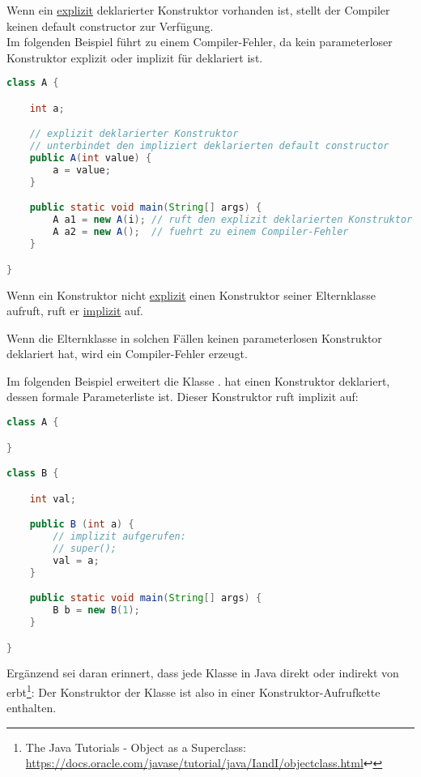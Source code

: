 Wenn ein \underline{explizit} deklarierter Konstruktor vorhanden ist, stellt der Compiler keinen default constructor zur Verfügung.\\

Im folgenden Beispiel führt  zu einem Compiler-Fehler, da kein parameterloser Konstruktor explizit oder implizit für  deklariert ist.

\begin{lstlisting}[language=java]
class A {

    int a;

    // explizit deklarierter Konstruktor
    // unterbindet den impliziert deklarierten default constructor
    public A(int value) {
        a = value;
    }

    public static void main(String[] args) {
        A a1 = new A(i); // ruft den explizit deklarierten Konstruktor auf
        A a2 = new A();  // fuehrt zu einem Compiler-Fehler
    }

}
\end{lstlisting}

Wenn ein Konstruktor nicht \underline{explizit} einen Konstruktor seiner Elternklasse aufruft, ruft er \underline{implizit}  auf.

Wenn die Elternklasse in solchen Fällen keinen parameterlosen Konstruktor deklariert hat, wird ein Compiler-Fehler erzeugt.

Im folgenden Beispiel erweitert  die Klasse .  hat einen Konstruktor deklariert, dessen
formale Parameterliste  ist. Dieser Konstruktor ruft implizit  auf:

\begin{lstlisting}[language=java]
class A {

}

class B {

    int val;

    public B (int a) {
        // implizit aufgerufen:
        // super();
        val = a;
    }

    public static void main(String[] args) {
        B b = new B(1);
    }

}
\end{lstlisting}

Ergänzend sei daran erinnert, dass jede Klasse in Java direkt oder indirekt von  erbt\footnote{
    The Java Tutorials - Object as a Superclass: \url{https://docs.oracle.com/javase/tutorial/java/IandI/objectclass.html}↩
}: Der Konstruktor der Klasse  ist also in einer Konstruktor-Aufrufkette enthalten.\\

